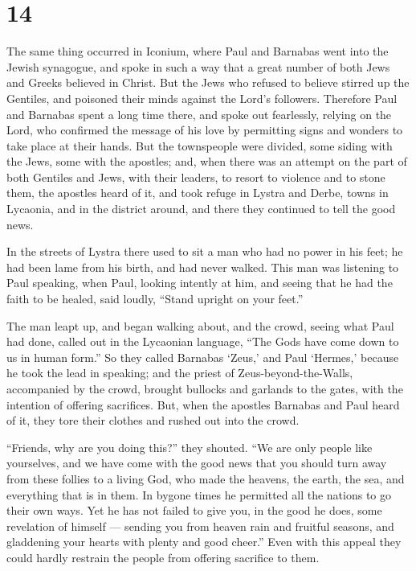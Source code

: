 \hypertarget{section-13}{%
\section{14}\label{section-13}}

 The same thing occurred in Iconium, where Paul and Barnabas
went into the Jewish synagogue, and spoke in such a way that a great
number of both Jews and Greeks believed in Christ.  But the
Jews who refused to believe stirred up the Gentiles, and poisoned their
minds against the Lord's followers.  Therefore Paul and
Barnabas spent a long time there, and spoke out fearlessly, relying on
the Lord, who confirmed the message of his love by permitting signs and
wonders to take place at their hands.  But the townspeople
were divided, some siding with the Jews, some with the apostles;
 and, when there was an attempt on the part of both Gentiles
and Jews, with their leaders, to resort to violence and to stone them,
 the apostles heard of it, and took refuge in Lystra and
Derbe, towns in Lycaonia, and in the district around,  and
there they continued to tell the good news.

 In the streets of Lystra there used to sit a man who had no
power in his feet; he had been lame from his birth, and had never
walked.  This man was listening to Paul speaking, when Paul,
looking intently at him, and seeing that he had the faith to be healed,
 said loudly, ``Stand upright on your feet.''

The man leapt up, and began walking about,  and the crowd,
seeing what Paul had done, called out in the Lycaonian language, ``The
Gods have come down to us in human form.''  So they called
Barnabas `Zeus,' and Paul `Hermes,' because he took the lead in
speaking;  and the priest of Zeus-beyond-the-Walls,
accompanied by the crowd, brought bullocks and garlands to the gates,
with the intention of offering sacrifices.  But, when the
apostles Barnabas and Paul heard of it, they tore their clothes and
rushed out into the crowd.

``Friends, why are you doing this?'' they shouted.  ``We
are only people like yourselves, and we have come with the good news
that you should turn away from these follies to a living God, who made
the heavens, the earth, the sea, and everything that is in them.
 In bygone times he permitted all the nations to go their
own ways.  Yet he has not failed to give you, in the good
he does, some revelation of himself --- sending you from heaven rain and
fruitful seasons, and gladdening your hearts with plenty and good
cheer.''  Even with this appeal they could hardly restrain
the people from offering sacrifice to them.

